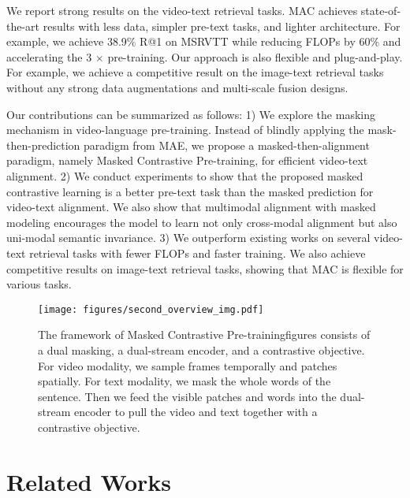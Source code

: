\documentclass[10pt,twocolumn,letterpaper]{article}
\begin{document}
We report strong results on the video-text retrieval tasks. MAC achieves state-of-the-art results with less data, simpler pre-text tasks, and lighter architecture. For example, we achieve 38.9\% R@1 on MSRVTT while reducing FLOPs by 60\% and accelerating the 3 $\times$ pre-training. Our approach is also flexible and plug-and-play. For example, we achieve a competitive result on the image-text retrieval tasks without any strong data augmentations and multi-scale fusion designs. 

Our contributions can be summarized as follows: 1) We explore the masking mechanism in video-language pre-training. Instead of blindly applying the mask-then-prediction paradigm from MAE, we propose a masked-then-alignment paradigm, namely Masked Contrastive Pre-training, for efficient video-text alignment. 
2) We conduct experiments to show that the proposed masked contrastive learning is a better pre-text task than the masked prediction for video-text alignment. We also show that multimodal alignment with masked modeling encourages the model to learn not only cross-modal alignment but also uni-modal semantic invariance.
3) We outperform existing works on several video-text retrieval tasks with fewer FLOPs and faster training. We also achieve competitive results on image-text retrieval tasks, showing that MAC is flexible for various tasks.

\begin{figure*}[t]
\centering
\texttt{[image: figures/second\_overview\_img.pdf]}
\vspace{-2mm}
\caption{The framework of Masked Contrastive Pre-trainingfigures consists of a dual masking, a dual-stream encoder, and a contrastive objective. For video modality, we sample frames temporally and patches spatially. For text modality, we mask the whole words of the sentence. Then we feed the visible patches and words into the dual-stream encoder to pull the video and text together with a contrastive objective. }
\vspace{-2mm}
\label{fig:current_method}
\end{figure*}


  
\vspace{-1mm}\section{Related Works}
\label{sec:related works}
\end{document}
